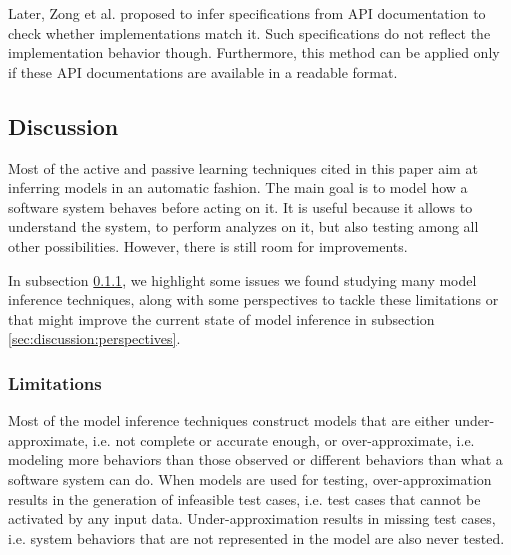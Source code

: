 Later, Zong et al. \cite{ZhongZXM11} proposed to infer
specifications from API documentation to check whether
implementations match it.  Such specifications do not reflect the
implementation behavior though. Furthermore, this method can be
applied only if these API documentations are available in a
readable format.


\subsection{Discussion}
\label{sec:discussion}

Most of the active and passive learning techniques cited in this
paper aim at inferring models in an automatic fashion. The main
goal is to model how a software system behaves before acting on
it. It is useful because it allows to understand the system, to
perform analyzes on it, but also testing among all other
possibilities.  However, there is still room for improvements.

In subsection \ref{sec:discussion:limitations}, we highlight some
issues we found studying many model inference techniques, along
with some perspectives to tackle these limitations or that might
improve the current state of model inference in subsection
\ref{sec:discussion:perspectives}.


\subsubsection{Limitations}
\label{sec:discussion:limitations}

Most of the model inference techniques construct models that are
either under-approximate, i.e. not complete or accurate enough,
or over-approximate, i.e. modeling more behaviors than those
observed or different behaviors than what a software system can
do. When models are used for testing, over-approximation results
in the generation of infeasible test cases, i.e.  test cases that
cannot be activated by any input data.  Under-approximation
results in missing test cases, i.e. system behaviors that are not
represented in the model are also never tested.

